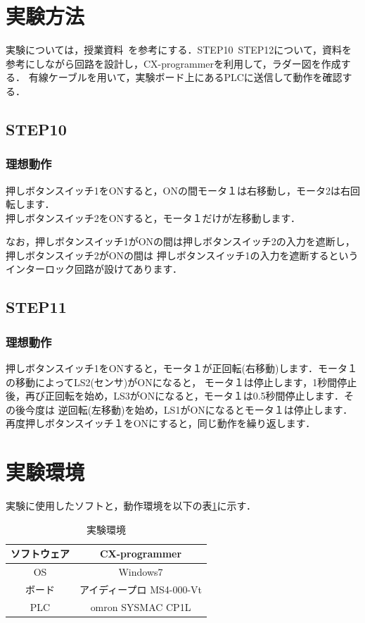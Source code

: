 \documentclass[a4paper,11pt]{jsarticle}
\begin{document}
\section{実験方法}
実験については，授業資料~\cite{Text}を参考にする．STEP10~STEP12について，資料を参考にしながら回路を設計し，CX-programmerを利用して，ラダー図を作成する．
有線ケーブルを用いて，実験ボード上にあるPLCに送信して動作を確認する．
\subsection{STEP10}
\subsubsection{理想動作}
押しボタンスイッチ1をONすると，ONの間モータ１は右移動し，モータ2は右回転します．\\
押しボタンスイッチ2をONすると，モータ１だけが左移動します．\par
なお，押しボタンスイッチ1がONの間は押しボタンスイッチ2の入力を遮断し，押しボタンスイッチ2がONの間は
押しボタンスイッチ1の入力を遮断するというインターロック回路が設けてあります．

\subsection{STEP11}
\subsubsection{理想動作}
押しボタンスイッチ1をONすると，モータ１が正回転(右移動)します．モータ１の移動によってLS2(センサ)がONになると，
モータ１は停止します，1秒間停止後，再び正回転を始め，LS3がONになると，モータ１は0.5秒間停止します．その後今度は
逆回転(左移動)を始め，LS1がONになるとモータ１は停止します．再度押しボタンスイッチ１をONにすると，同じ動作を繰り返します．

\section{実験環境}
実験に使用したソフトと，動作環境を以下の表\ref{T:En}に示す．
\begin{table}[H]
  \begin{center}
    \caption{実験環境}
    \begin{tabular}{|c|c|} \hline
      ソフトウェア & CX-programmer             \\ \hline
      OS           & Windows7                  \\ \hline
      ボード       & アイディープロ MS4-000-Vt \\ \hline
      PLC          & omron SYSMAC CP1L         \\ \hline
    \end{tabular}
    \label{T:En}
  \end{center}
\end{table}
\end{document}
